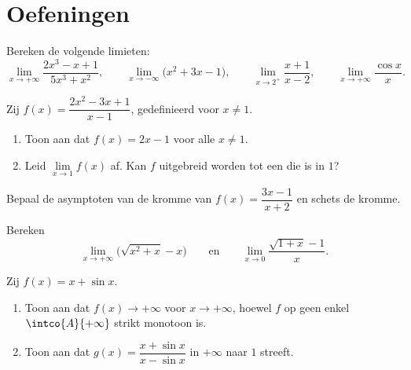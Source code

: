 \section{Oefeningen}

\begin{exercise}[$\star$]\label{exo:g12:limcont:1}
Bereken de volgende limieten:
\[
\lim_{x\to+\infty} \frac{2x^3 - x + 1}{5x^3 + x^2}, \qquad
\lim_{x\to-\infty} \bigl(x^2 + 3x - 1\bigr), \qquad
\lim_{x\to 2^+} \frac{x+1}{x-2}, \qquad
\lim_{x\to+\infty} \frac{\cos x}{x}.
\]
\end{exercise}

\begin{exercise}[$\star$]\label{exo:g12:limcont:2}
Zij $f(x) = \dfrac{2x^2 - 3x + 1}{x - 1}$, gedefinieerd voor $x \neq 1$.
\begin{enumerate}
  \item Toon aan dat $f(x) = 2x - 1$ voor alle $x \neq 1$.
  \item Leid $\lim\limits_{x \to 1} f(x)$ af. Kan $f$ uitgebreid worden tot
        een  die  is in $1$?
\end{enumerate}
\end{exercise}

\begin{exercise}[$\star$]\label{exo:g12:limcont:3}
Bepaal de asymptoten van de kromme van $f(x) = \dfrac{3x - 1}{x + 2}$ en
schets de kromme.
\end{exercise}

\begin{exercise}[$\star\star$]\label{exo:g12:limcont:4}
Bereken
\[
\lim_{x\to+\infty} \bigl(\sqrt{x^2 + x} - x\bigr)
\qquad\text{en}\qquad
\lim_{x\to 0} \frac{\sqrt{1+x} - 1}{x}.
\]
\end{exercise}

\begin{exercise}[$\star\star$]\label{exo:g12:limcont:5}
Zij $f(x) = x + \sin x$.
\begin{enumerate}
  \item Toon aan dat $f(x) \to +\infty$ voor $x \to +\infty$, hoewel $f$ op
        geen enkel  $\intco{A}{+\infty}$ strikt monotoon is.
  \item Toon aan dat $g(x) = \dfrac{x + \sin x}{x - \sin x}$ in $+\infty$
        naar $1$ streeft.
\end{enumerate}
\end{exercise}

